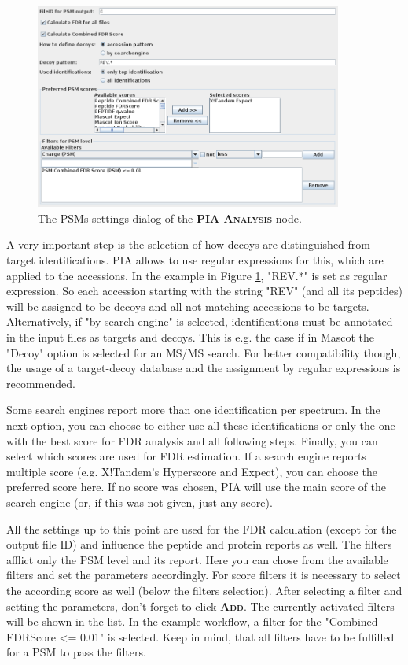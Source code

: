 \documentclass[a4paper,11pt,twoside]{article}
\newcommand{\menu}[1]{{\scshape\bfseries #1}}
\newcommand{\knimenode}[1]{{\scshape\bfseries #1}}
\begin{document}
\begin{figure}[ht!]
	\centering
	\includegraphics[width=0.9\textwidth]{graphics/pia_settings_psms}
	\caption{The PSMs settings dialog of the \knimenode{PIA Analysis} node.}
	\label{pia_settings_psms}
\end{figure}

A very important step is the selection of how decoys are distinguished from
target identifications. PIA allows to use regular expressions for this, which
are applied to the accessions. In the example in Figure
\ref{pia_settings_psms}, "REV.*" is set as regular expression. So each
accession starting with the string "REV" (and all its peptides) will be
assigned to be decoys and all not matching accessions to be targets.
Alternatively, if "by search engine" is selected, identifications must be
annotated in the input files as targets and decoys. This is e.g. the case if in
Mascot the "Decoy" option is selected for an MS/MS search. For better
compatibility though, the usage of a target-decoy database and the assignment
by regular expressions is recommended.

Some search engines report more than one identification per spectrum. In the
next option, you can choose to either use all these identifications or only the
one with the best score for FDR analysis and all following steps. Finally, you
can select which scores are used for FDR estimation. If a search engine reports
multiple score (e.g. X!Tandem's Hyperscore and Expect), you can choose the
preferred score here. If no score was chosen, PIA will use the main score of
the search engine (or, if this was not given, just any score).

All the settings up to this point are used for the FDR calculation (except for
the output file ID) and influence the peptide and protein reports as well. The
filters afflict only the PSM level and its report. Here you can chose from the
available filters and set the parameters accordingly. For score filters it is
necessary to select the according score as well (below the filters selection).
After selecting a filter and setting the parameters, don't forget to click
\menu{Add}. The currently activated filters will be shown in the list. In the
example workflow, a filter for the "Combined FDRScore <= 0.01" is selected.
Keep in mind, that all filters have to be fulfilled for a PSM to pass the
filters.
\end{document}

